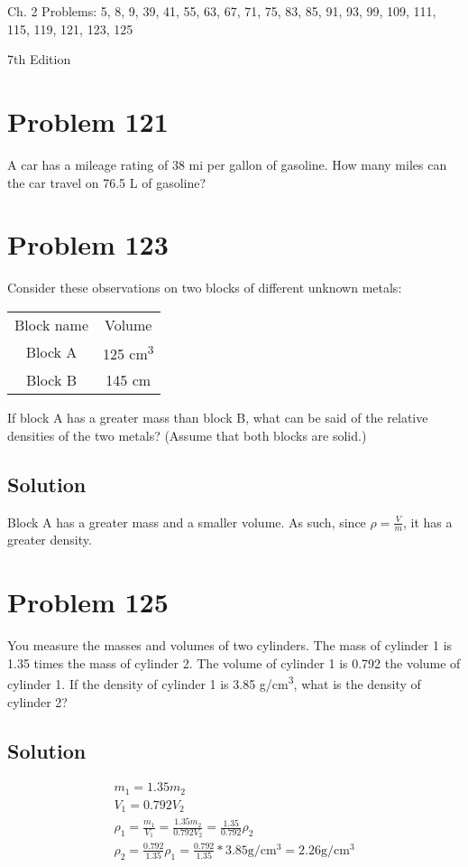 \documentclass[11pt]{article}
\begin{document}
Ch. 2 Problems: 5, 8, 9, 39, 41, 55, 63, 67, 71, 75, 83, 85, 91, 93, 99, 109, 111, 115, 119, 121, 123, 125

7th Edition
\pagebreak
\section{Problem 121}
A car has a mileage rating of 38 mi per gallon of gasoline. How many miles can the car travel on 76.5 L of gasoline?

\section{Problem 123}
Consider these observations on two blocks of different unknown metals:

\begin{center}
    \begin{tabular*}{0.25\textwidth}{c c}
        Block name  & Volume \\
        Block A     & 125 \unit{\centi\meter^3}\\
        Block B     & 145 \unit{\centi\meter}
    \end{tabular*}
\end{center}          
        
If block A has a greater mass than block B, what can be said of the relative densities of the two metals? (Assume that both blocks are solid.)

\subsection{Solution}
Block A has a greater mass and a smaller volume. As such, since $\rho = \frac{V}{m}$, it has a greater density.

\section{Problem 125}
You measure the masses and volumes of two cylinders. The mass of cylinder 1 is 1.35 times the mass of cylinder 2. The volume of cylinder 1 is 0.792 the volume of cylinder 1. If the density of cylinder 1 is 3.85 \unit{\gram/\centi\meter^3}, what is the density of cylinder 2?

\subsection{Solution}
\begin{gather}
    m_1 = 1.35 m_2\\
    V_1 = 0.792 V_2\\
    \rho_1 = \frac{m_1}{V_1} = \frac{1.35 m_2}{0.792 V_2} = \frac{1.35}{0.792}\rho_2\\
    \rho_2 = \frac{0.792}{1.35}\rho_1 = \frac{0.792}{1.35}*3.85 \unit{\gram/\centi\meter^3} = \boxed{2.26 \unit{\gram/\centi\meter^3}}
\end{gather}
\end{document}
